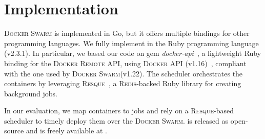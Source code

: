 
\section{Implementation}
\label{sec:implementation}

\textsc{Docker Swarm} is implemented in Go, but it offers multiple bindings for other programming languages.
We fully implement \GP in the Ruby programming language (v2.3.1).
In particular, we based our code on gem \emph{docker-api}~\cite{docker-api}, a lightweight Ruby binding for the \textsc{Docker Remote} API, using \textsc{Docker} API (v1.16)~\cite{docker-remote}, compliant with the one used by \textsc{Docker Swarm}(v1.22).
The scheduler orchestrates the containers by leveraging \textsc{Resque}~\cite{resque}, a \textsc{Redis}-backed Ruby library for creating background jobs.

In our evaluation, we map containers to jobs and rely on a \textsc{Resque}-based scheduler to timely deploy them over the \textsc{Docker Swarm}.
\GP is released as open-source and is freely available at \testbedrepo.
